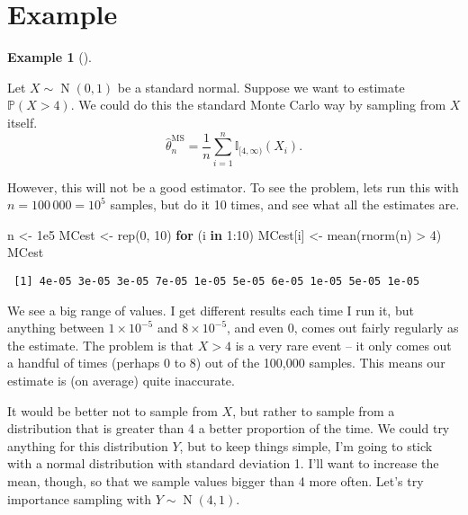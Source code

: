 \documentclass[
  letterpaper,
  DIV=11,
  numbers=noendperiod]{scrreprt}
\newenvironment{Shaded}{\begin{snugshade}}{\end{snugshade}}
\newcommand{\ControlFlowTok}[1]{\textcolor[rgb]{0.00,0.23,0.31}{\textbf{#1}}}
\newcommand{\DecValTok}[1]{\textcolor[rgb]{0.68,0.00,0.00}{#1}}
\newcommand{\FloatTok}[1]{\textcolor[rgb]{0.68,0.00,0.00}{#1}}
\newcommand{\FunctionTok}[1]{\textcolor[rgb]{0.28,0.35,0.67}{#1}}
\newcommand{\NormalTok}[1]{\textcolor[rgb]{0.00,0.23,0.31}{#1}}
\newcommand{\OtherTok}[1]{\textcolor[rgb]{0.00,0.23,0.31}{#1}}
\newcommand{\SpecialCharTok}[1]{\textcolor[rgb]{0.37,0.37,0.37}{#1}}
\theoremstyle{plain}
\theoremstyle{definition}
\theoremstyle{definition}
\newtheorem{example}{Example}[chapter]
\theoremstyle{remark}
\begin{document}
\section{Example}\label{example}

\begin{example}[]\protect\hypertarget{exm-IS1}{}\label{exm-IS1}

Let \(X \sim \operatorname{N}(0,1)\) be a standard normal. Suppose we
want to estimate \(\mathbb P(X > 4)\). We could do this the standard
Monte Carlo way by sampling from \(X\) itself.
\[ \widehat{\theta}_n^{\mathrm{MS}} = \frac{1}{n} \sum_{i=1}^n \mathbb I_{[4,\infty)}(X_i) . \]

However, this will not be a good estimator. To see the problem, lets run
this with \(n = 100\,000 = 10^5\) samples, but do it 10 times, and see
what all the estimates are.

\begin{Shaded}
\begin{Highlighting}[]
\NormalTok{n }\OtherTok{\textless{}{-}} \FloatTok{1e5}
\NormalTok{MCest }\OtherTok{\textless{}{-}} \FunctionTok{rep}\NormalTok{(}\DecValTok{0}\NormalTok{, }\DecValTok{10}\NormalTok{)}
\ControlFlowTok{for}\NormalTok{ (i }\ControlFlowTok{in} \DecValTok{1}\SpecialCharTok{:}\DecValTok{10}\NormalTok{) MCest[i] }\OtherTok{\textless{}{-}} \FunctionTok{mean}\NormalTok{(}\FunctionTok{rnorm}\NormalTok{(n) }\SpecialCharTok{\textgreater{}} \DecValTok{4}\NormalTok{)}
\NormalTok{MCest}
\end{Highlighting}
\end{Shaded}

\begin{verbatim}
 [1] 4e-05 3e-05 3e-05 7e-05 1e-05 5e-05 6e-05 1e-05 5e-05 1e-05
\end{verbatim}

We see a big range of values. I get different results each time I run
it, but anything between \(1 \times 10^{-5}\) and \(8 \times 10^{-5}\),
and even \(0\), comes out fairly regularly as the estimate. The problem
is that \(X > 4\) is a very rare event -- it only comes out a handful of
times (perhaps 0 to 8) out of the 100,000 samples. This means our
estimate is (on average) quite inaccurate.

It would be better not to sample from \(X\), but rather to sample from a
distribution that is greater than 4 a better proportion of the time. We
could try anything for this distribution \(Y\), but to keep things
simple, I'm going to stick with a normal distribution with standard
deviation 1. I'll want to increase the mean, though, so that we sample
values bigger than 4 more often. Let's try importance sampling with
\(Y \sim \operatorname{N}(4,1)\).


\end{example}
\end{document}
